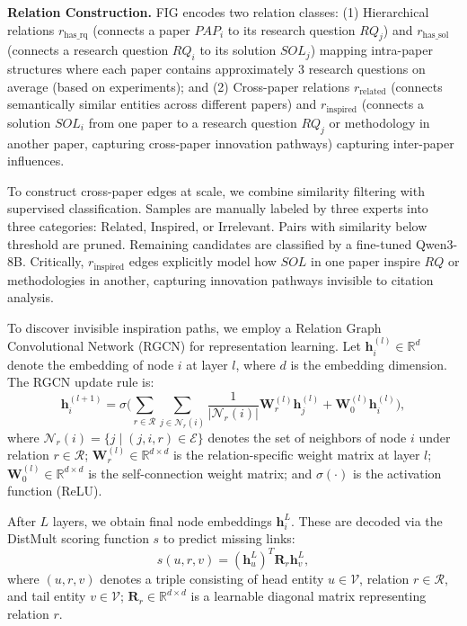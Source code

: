 \documentclass[runningheads]{llncs}
\begin{document}
\textbf{Relation Construction.} FIG encodes two relation classes: (1) Hierarchical relations $r_{\text{has\_rq}}$ (connects a paper $PAP_i$ to its research question $RQ_j$) and $r_{\text{has\_sol}}$ (connects a research question $RQ_i$ to its solution $SOL_j$) mapping intra-paper structures where each paper contains approximately 3 research questions on average (based on experiments); and (2) Cross-paper relations $r_{\text{related}}$ (connects semantically similar entities across different papers) and $r_{\text{inspired}}$ (connects a solution $SOL_i$ from one paper to a research question $RQ_j$ or methodology in another paper, capturing cross-paper innovation pathways) capturing inter-paper influences.

To construct cross-paper edges at scale, we combine similarity filtering with supervised classification. Samples are manually labeled by three experts into three categories: Related, Inspired, or Irrelevant. Pairs with similarity below threshold are pruned. Remaining candidates are classified by a fine-tuned Qwen3-8B. Critically, $r_{\text{inspired}}$ edges explicitly model how $SOL$ in one paper inspire $RQ$ or methodologies in another, capturing innovation pathways invisible to citation analysis.

To discover invisible inspiration paths, we employ a Relation Graph Convolutional Network (RGCN) for representation learning. Let $\mathbf{h}_i^{(l)} \in \mathbb{R}^d$ denote the embedding of node $i$ at layer $l$, where $d$ is the embedding dimension. The RGCN update rule is:
\begin{equation}
    \mathbf{h}_i^{(l+1)} = \sigma \Bigg( \sum_{r \in \mathcal{R}} \sum_{j \in \mathcal{N}_r(i)} \frac{1}{|\mathcal{N}_r(i)|} \mathbf{W}_r^{(l)} \mathbf{h}_j^{(l)} + \mathbf{W}_0^{(l)} \mathbf{h}_i^{(l)} \Bigg),
\end{equation}
where $\mathcal{N}_r(i) = \{j \mid (j, i, r) \in \mathcal{E}\}$ denotes the set of neighbors of node $i$ under relation $r \in \mathcal{R}$; $\mathbf{W}_r^{(l)} \in \mathbb{R}^{d \times d}$ is the relation-specific weight matrix at layer $l$; $\mathbf{W}_0^{(l)} \in \mathbb{R}^{d \times d}$ is the self-connection weight matrix; and $\sigma(\cdot)$ is the activation function (ReLU).

After $L$ layers, we obtain final node embeddings $\mathbf{h}_i^L$. These are decoded via the DistMult scoring function $s$ to predict missing links:
\begin{equation}
    s(u, r, v) = (\mathbf{h}_u^L)^T \mathbf{R}_r \mathbf{h}_v^L,
\end{equation}
where $(u, r, v)$ denotes a triple consisting of head entity $u \in \mathcal{V}$, relation $r \in \mathcal{R}$, and tail entity $v \in \mathcal{V}$; $\mathbf{R}_r \in \mathbb{R}^{d \times d}$ is a learnable diagonal matrix representing relation $r$.
\end{document}
